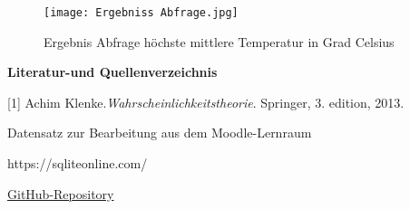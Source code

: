 \documentclass{article}
\begin{document}
\centering{\Huge\textbf{$\downarrow$}}

\begin{figure}[H]
    \centering
    \texttt{[image: Ergebniss Abfrage.jpg]}
    \caption{Ergebnis Abfrage höchste mittlere Temperatur in Grad Celsius}
    \label{fig:enter-label}
\end{figure}






\newpage
{}
\raggedright{\Large\textbf{Literatur-und Quellenverzeichnis}}
\vspace{10pt}

\noindent\label{eq:literatur}[1] Achim Klenke.\textit{Wahrscheinlichkeitstheorie}. Springer, 3. edition, 2013.
\vspace{10pt}

Datensatz zur Bearbeitung aus dem Moodle-Lernraum
\vspace{10pt}

https://sqliteonline.com/
\vspace{10pt}

\href{https://github.com/Kristofer13/Latex-Abgabe/commit/}{GitHub-Repository}
\end{document}
